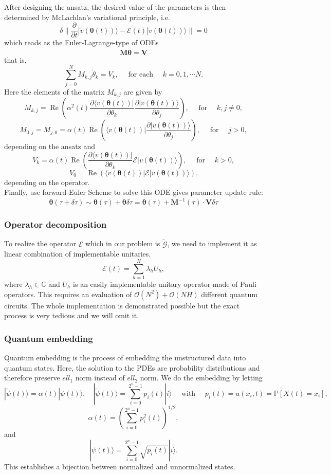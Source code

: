 \documentclass[11pt]{article}
\theoremstyle{definition}
\begin{document}
After designing the ansatz, the desired value of the parameters is then determined by McLachlan's variational principle, i.e.
$$
\delta \| \frac{\partial}{\partial t}|\tilde{v}(\boldsymbol{\theta}(t))\rangle-\mathcal{E}(t)|\tilde{v}(\boldsymbol{\theta}(t))\rangle \|=0
$$
which reads as the Euler-Lagrange-type of ODEs
$$
\boldsymbol{M} \dot{\boldsymbol{\theta}} = \boldsymbol{V}
$$
that is,
$$
\sum_{j=0}^N M_{k, j} \dot{\theta}_k=V_k, \quad \text { for each } \quad k=0,1, \cdots N .
$$
Here the elements of the matrix $M_{k, j}$ are given by
$$
M_{k, j}=\operatorname{Re}\left(\alpha^2(t) \frac{\partial\langle v(\boldsymbol{\theta}(t))|}{\partial \theta_k} \frac{\partial|v(\boldsymbol{\theta}(t))\rangle}{\partial \theta_j}\right), \quad \text { for } \quad k, j \neq 0,
$$
$$
M_{0, j}=M_{j, 0}=\alpha(t) \operatorname{Re}\left(\langle v(\boldsymbol{\theta}(t))| \frac{\partial|v(\boldsymbol{\theta}(t))\rangle}{\partial \theta_j}\right), \quad \text { for } \quad j>0,
$$
depending on the ansatz and
$$
V_k=\alpha(t) \operatorname{Re}\left(\frac{\partial\langle v(\boldsymbol{\theta}(t))|}{\partial \theta_k} \mathcal{E}|v(\boldsymbol{\theta}(t))\rangle\right), \quad \text { for } \quad k>0,
$$
$$
 V_0=\operatorname{Re}(\langle v(\boldsymbol{\theta}(t))|\mathcal{E}| v(\boldsymbol{\theta}(t))\rangle).
 $$
 depending on the operator.\\
 
 Finally, use forward-Euler Scheme to solve this ODE gives parameter update rule:
$$
\boldsymbol{\theta}(\tau+\delta \tau) \sim \boldsymbol{\theta}(\tau)+\dot{\boldsymbol{\theta}} \delta \tau=\boldsymbol{\theta}(\tau)+\mathbf{M}^{-1}(\tau) \cdot \mathbf{V} \delta \tau
$$
\subsubsection{Operator decomposition}
To realize the operator $\mathcal{E}$ which in our problem is $ \tilde{\mathcal{G}}$, we need to implement it as linear combination of implementable unitaries.
$$
\mathcal{E}(t)=\sum_{h=1}^H \lambda_h U_h,
$$
where $\lambda_h \in \mathbb{C}$ and $U_h$ is an easily implementable unitary operator made of Pauli operators. This requires an evaluation of $\mathcal{O}\left(N^2\right)+\mathcal{O}(N H)$ different quantum circuits. The whole implementation is demonstrated possible but the exact process is very tedious and we will omit it.
\subsubsection{Quantum embedding}
Quantum embedding is the process of embedding the unstructured data into quantum states. Here, the solution to the PDEs are probability distributions and therefore preserve $ell_1$ norm instead of $ell_2$ norm. We do the embedding by letting
$$
|\tilde{\psi}(t)\rangle=\alpha(t)|\psi(t)\rangle, \quad|\tilde{\psi}(t)\rangle=\sum_{i=0}^{2^n-1} p_i(t)|i\rangle \quad \text { with } \quad p_i(t)=u\left(x_i, t\right)=\mathbb{P}\left[X(t)=x_i\right],
$$
$$
\alpha(t)=\left(\sum_{i=0}^{2^n-1} p_i^2(t)\right)^{1 / 2},
$$
and
$$
|\psi(t)\rangle=\sum_{i=0}^{2^n-1} \sqrt{p_i(t)}|i\rangle .
$$
This establishes a bijection between normalized and unnormalized states.
\end{document}
